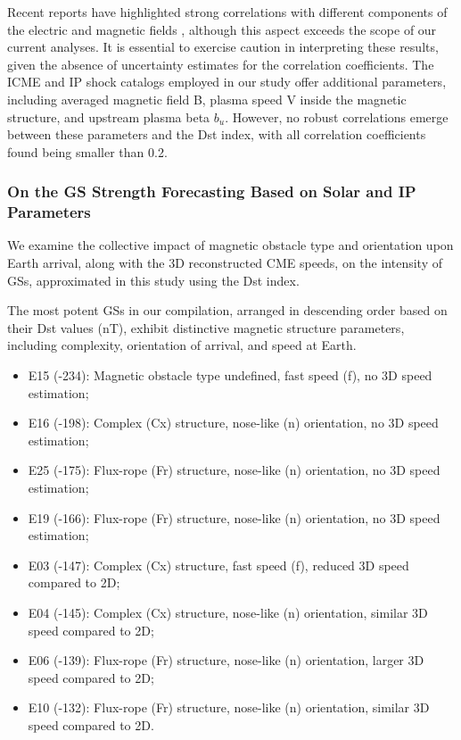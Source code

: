 Recent reports have highlighted strong correlations with different components of the electric and magnetic fields \citep{echer_2022}, although this aspect exceeds the scope of our current analyses. It is essential to exercise caution in interpreting these results, given the absence of uncertainty estimates for the correlation coefficients.
The ICME and IP shock catalogs employed in our study offer additional parameters, including averaged magnetic field B, plasma speed V inside the magnetic structure, and upstream plasma beta $b_u$. However, no robust correlations emerge between these parameters and the Dst index, with all correlation coefficients found being smaller than 0.2.

\subsubsection{On the GS Strength Forecasting Based on Solar and IP Parameters}
We examine the collective impact of magnetic obstacle type and orientation upon Earth arrival, along with the 3D reconstructed CME speeds, on the intensity of GSs, approximated in this study using the Dst index.

The most potent GSs in our compilation, arranged in descending order based on their Dst values (nT), exhibit distinctive magnetic structure parameters, including complexity, orientation of arrival, and speed at Earth.

\begin{itemize}
	\item E15 (-234): Magnetic obstacle type undefined, fast speed (f), no 3D speed estimation;
	\item E16 (-198): Complex (Cx) structure, nose-like (n) orientation, no 3D speed estimation;
	\item E25 (-175): Flux-rope (Fr) structure, nose-like (n) orientation, no 3D speed estimation;
	\item E19 (-166): Flux-rope (Fr) structure, nose-like (n) orientation, no 3D speed estimation;
	\item E03 (-147): Complex (Cx) structure, fast speed (f), reduced 3D speed compared to 2D;
	\item E04 (-145): Complex (Cx) structure, nose-like (n) orientation, similar 3D speed compared to 2D;
	\item E06 (-139): Flux-rope (Fr) structure, nose-like (n) orientation, larger 3D speed compared to 2D;
	\item E10 (-132): Flux-rope (Fr) structure, nose-like (n) orientation, similar 3D speed compared to 2D.
\end{itemize}

